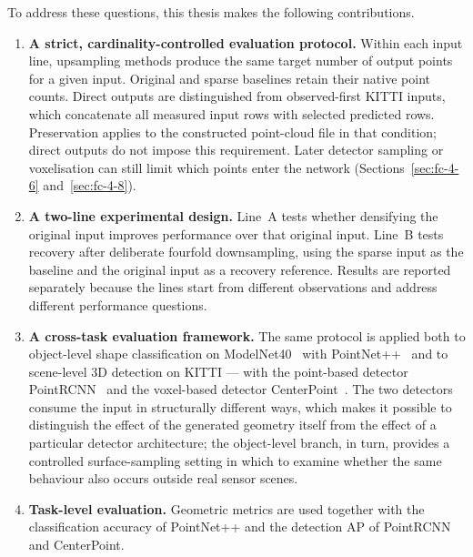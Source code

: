 To address these questions, this thesis makes the following contributions.

\begin{enumerate}
    \item \textbf{A strict, cardinality-controlled evaluation protocol.}
    Within each input line, upsampling methods produce the same target
    number of output points for a given input. Original and sparse
    baselines retain their native point counts. Direct outputs are
    distinguished from observed-first KITTI inputs, which concatenate
    all measured input rows with selected predicted rows. Preservation
    applies to the constructed point-cloud file in that condition; direct
    outputs do not impose this requirement. Later detector sampling or
    voxelisation can still limit which points enter the network
    (Sections~\ref{sec:fc-4-6} and~\ref{sec:fc-4-8}).

    \item \textbf{A two-line experimental design.} Line~A tests whether
    densifying the original input improves performance over that original
    input. Line~B tests recovery after deliberate fourfold downsampling,
    using the sparse input as the baseline and the original input as a
    recovery reference. Results are reported separately because the lines
    start from different observations and address different performance
    questions.

    \item \textbf{A cross-task evaluation framework.} The same protocol is
    applied both to object-level shape classification on
    ModelNet40~\cite{wu2015modelnet} with PointNet++~\cite{qi2017pointnetpp}
    and to scene-level 3D detection on KITTI --- with the point-based
    detector PointRCNN~\cite{shi2019pointrcnn} and the voxel-based detector
    CenterPoint~\cite{yin2021centerpoint}. The two detectors consume the
    input in structurally different ways, which makes it possible to
    distinguish the effect of the generated geometry itself from the effect
    of a particular detector architecture; the object-level branch, in turn,
    provides a controlled surface-sampling setting in which to examine
    whether the same behaviour also occurs outside real sensor scenes.

    \item \textbf{Task-level evaluation.} Geometric metrics are used
    together with the classification accuracy of PointNet++ and the
    detection \ac{AP} of PointRCNN and CenterPoint.


\end{enumerate}
